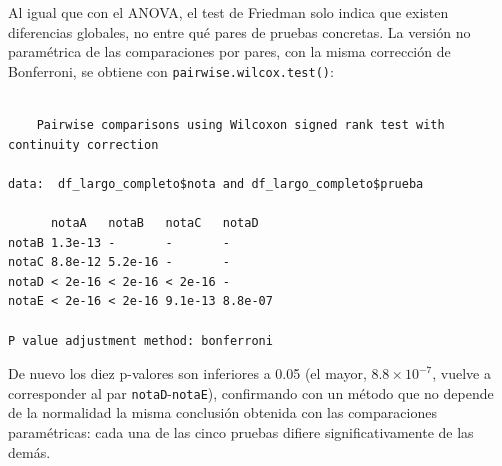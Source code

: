 \documentclass[
  spanish,
  a4paper,
]{scrreport}
\newenvironment{Shaded}{\begin{snugshade}}{\end{snugshade}}
\newcommand{\AttributeTok}[1]{\textcolor[rgb]{0.40,0.45,0.13}{#1}}
\newcommand{\ConstantTok}[1]{\textcolor[rgb]{0.56,0.35,0.01}{#1}}
\newcommand{\FunctionTok}[1]{\textcolor[rgb]{0.28,0.35,0.67}{#1}}
\newcommand{\NormalTok}[1]{\textcolor[rgb]{0.00,0.23,0.31}{#1}}
\newcommand{\SpecialCharTok}[1]{\textcolor[rgb]{0.37,0.37,0.37}{#1}}
\newcommand{\StringTok}[1]{\textcolor[rgb]{0.13,0.47,0.30}{#1}}
\theoremstyle{definition}
\theoremstyle{definition}
\theoremstyle{remark}
\begin{document}
Al igual que con el ANOVA, el test de Friedman solo indica que existen
diferencias globales, no entre qué pares de pruebas concretas. La
versión no paramétrica de las comparaciones por pares, con la misma
corrección de Bonferroni, se obtiene con
\texttt{pairwise.wilcox.test()}:

\begin{Shaded}
\end{Shaded}

\begin{verbatim}

    Pairwise comparisons using Wilcoxon signed rank test with continuity correction 

data:  df_largo_completo$nota and df_largo_completo$prueba 

      notaA   notaB   notaC   notaD  
notaB 1.3e-13 -       -       -      
notaC 8.8e-12 5.2e-16 -       -      
notaD < 2e-16 < 2e-16 < 2e-16 -      
notaE < 2e-16 < 2e-16 9.1e-13 8.8e-07

P value adjustment method: bonferroni 
\end{verbatim}

De nuevo los diez p-valores son inferiores a 0.05 (el mayor,
\(8.8\times10^{-7}\), vuelve a corresponder al par
\texttt{notaD}-\texttt{notaE}), confirmando con un método que no depende
de la normalidad la misma conclusión obtenida con las comparaciones
paramétricas: cada una de las cinco pruebas difiere significativamente
de las demás.
\end{document}

